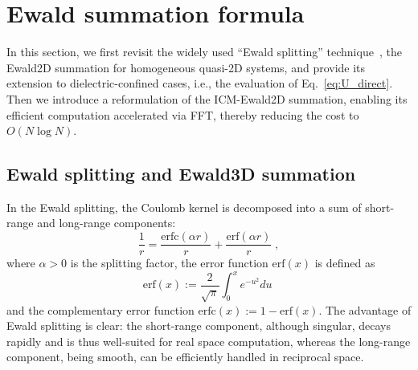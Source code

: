 \section{Ewald summation formula}

In this section, we first revisit the widely used ``Ewald splitting'' technique~\cite{ewald1921berechnung}, the Ewald2D summation for homogeneous quasi-2D systems, and provide its extension to dielectric-confined cases, i.e., the evaluation of Eq.~\eqref{eq:U_direct}.
Then we introduce a reformulation of the ICM-Ewald2D summation, enabling its efficient computation accelerated via FFT, thereby reducing the cost to $ O(N \log N)$. 

\subsection{Ewald splitting and Ewald3D summation} \label{sec::ewald_splitting}

In the Ewald splitting, the Coulomb kernel is decomposed into a sum of short-range and long-range components:
\begin{equation}\label{eq:ewald_decomposition}
\frac{1}{r}=\frac{\mathrm{erfc}(\alpha r)}{r}+\frac{\mathrm{erf}(\alpha r)}{r} \;,
\end{equation}
where $\alpha>0$ is the splitting factor, the error function $\mathrm{erf}(x)$ is  defined as
\begin{equation}\label{eq:erf}
    \mathrm{erf}(x):=\frac{2}{\sqrt{\pi}}\int_0^x e^{-u^2}du\;
\end{equation}
and the complementary error function $\mathrm{erfc}(x):=1-\mathrm{erf}(x)$. 
The advantage of Ewald splitting is clear:
the short-range component, although singular, decays rapidly and is thus well-suited for real space computation, whereas the long-range component, being smooth, can be efficiently handled in reciprocal space.


